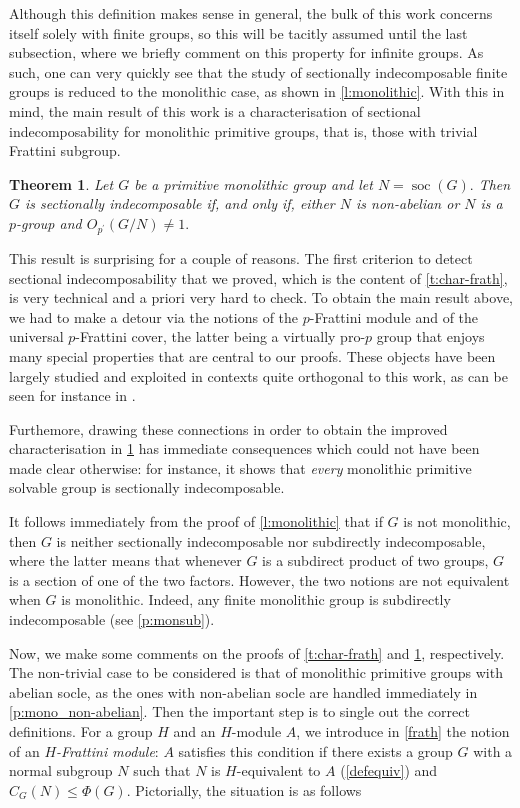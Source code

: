 \documentclass[a4paper,10pt]{amsart}
\theoremstyle{plain}
\newtheorem{thm}{Theorem}[section]
\theoremstyle{definition}
\DeclareMathOperator{\soc}{soc}
\begin{document}
Although this definition makes sense in general, the bulk of this work concerns itself solely with finite groups, so this will be tacitly assumed until the last subsection, where we briefly comment on this property for infinite groups. As such, one can very quickly see that the study of sectionally indecomposable finite groups is reduced to the monolithic case, as shown in \cref{l:monolithic}. With this in mind, the main result of this work is a characterisation of sectional indecomposability for monolithic primitive groups, that is, those with trivial Frattini subgroup.

\begin{thm}\label{t:main}
Let $G$ be a primitive monolithic group and let $N=\soc(G).$ Then $G$ is sectionally indecomposable if, and only if, either $N$ is non-abelian or $N$ is a $p$-group and $O_{p^\prime}(G/N)\neq1.$
\end{thm}

This result is surprising for a couple of reasons. The first criterion to detect sectional indecomposability that we proved, which is the content of \cref{t:char-frath}, is very technical and a priori very hard to check. To obtain the main result above, we had to make a detour via the notions of the $p$-Frattini module and of the universal $p$-Frattini cover, the latter being a virtually pro-$p$ group that enjoys many special properties that are central to our proofs. These objects have been largely studied and exploited in contexts quite orthogonal to this work, as can be seen for instance in \cite{fried}.

Furthemore, drawing these connections in order to obtain the improved characterisation in \cref{t:main} has immediate consequences which could not have been made clear otherwise: for instance, it shows that \emph{every} monolithic primitive solvable group is sectionally indecomposable.

It follows immediately from the proof of \cref{l:monolithic} that if $G$ is not monolithic, then $G$ is neither sectionally indecomposable nor subdirectly indecomposable, where the latter means that whenever $G$ is a subdirect product of two groups, $G$ is a section of one of the two factors. However, the two notions are not equivalent when $G$ is monolithic. Indeed, any finite monolithic group is subdirectly indecomposable (see \cref{p:monsub}).

Now, we make some comments on the proofs of \cref{t:char-frath} and \cref{t:main}, respectively. The non-trivial case to be considered is that of monolithic primitive groups with abelian socle, as the ones with non-abelian socle are handled immediately in \cref{p:mono_non-abelian}. Then the important step is to single out the correct definitions. For a group $H$ and an $H$-module $A$, we introduce in \cref{frath} the notion of an \emph{$H$-Frattini module}: $A$ satisfies this condition if there exists a group $G$ with a normal subgroup $N$ such that $N$ is $H$-equivalent to $A$ (\cref{defequiv}) and $C_G(N) \leq \Phi(G)$. Pictorially, the situation is as follows
\end{document}
